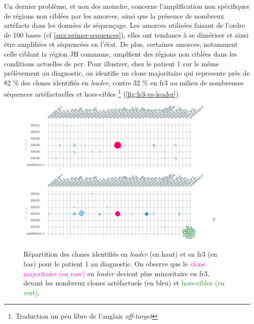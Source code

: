 Un dernier problème, et non des moindre, concerne l'amplification non spécifiques de régions non ciblées par les amorces, 
ainsi que la présence de nombreux artéfacts dans les données de séquençage. Les amorces utilisées faisant de l'ordre de 100 bases 
(cf \autoref{anx:primer-sequences}), elles ont tendance à se dimériser et ainsi être amplifiées et séquencées en l'état. 
De plus, certaines amorces, notamment celle ciblant la région JH commune, amplfient des régions non ciblées dans 
les conditions actuelles de \gls{pcr}. Pour illustrer, chez le patient 1 sur le même prélèvement au diagnostic, on identifie 
un clone majoritaire qui represente près de 82 \% des clones identifiés en \textit{leader}, contre 32 \% en \gls{fr}3 au milieu 
de nombreuses séquences artéfactuelles et hors-cibles \footnote{Traduction un peu libre de l'anglais \textit{off-target}} (\autoref{fig:fr3-vs-leader}).

\begin{figure}[H]
    \centering
    \includegraphics[width=1\textwidth]{images/diag_leader.png}
    \vspace{0.5cm}
    \includegraphics[width=1\textwidth]{images/diag_fr3.png}
    \caption{
        Répartition des clones identifiés en \textit{leader} (en haut) et en \gls{fr}3 (en bas) 
        pour le patient 1 au diagnostic. On observe que le \textcolor{Magenta}{clone majoritaire (en rose)} 
        en \textit{leader} devient plus minoritaire en \gls{fr}3, devant les \textcolor{ProcessBlue}{nombreux clones artéfactuels (en bleu)}  
        et \textcolor{ForestGreen}{hors-cibles (en vert)}.
    }
    \label{fig:fr3-vs-leader}
\end{figure}

